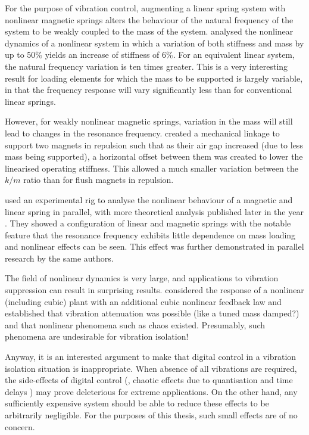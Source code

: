 For the purpose of vibration control, augmenting a linear spring system with
nonlinear magnetic springs alters the behaviour of the natural frequency of
the system to be weakly coupled to the mass of the system.
\textcite{dangola2006} analysed the nonlinear dynamics of a nonlinear system
in which a variation of both stiffness and mass by up to 50\% yields an
increase of stiffness of 6\%. For an equivalent linear system, the natural
frequency variation is ten times greater. This is a very interesting result
for loading elements for which the mass to be supported is largely variable,
in that the frequency response will vary significantly less than for
conventional linear springs.

However, for weakly nonlinear magnetic springs, variation in the mass will
still lead to changes in the resonance frequency. \textcite{todaka2001}
created a mechanical linkage to support two magnets in repulsion such that as
their air gap increased (due to less mass being supported), a horizontal
offset between them was created to lower the linearised operating stiffness.
This allowed a much smaller variation between the $k/m$ ratio than for flush
magnets in repulsion.

\textcite{bonisoli2007} used an experimental rig to analyse the nonlinear
behaviour of a magnetic and linear spring in parallel, with more theoretical
analysis published later in the year \cite{bonisoli2007b}. They showed a
configuration of linear and magnetic springs with the notable feature that the
resonance frequency exhibits little dependence on mass loading and nonlinear
effects can be seen. This effect was further demonstrated in parallel research
by the same authors.

The field of nonlinear dynamics is very large, and applications to vibration
suppression can result in surprising results. \textcite{oueini1999} considered
the response of a nonlinear (including cubic) plant with an additional cubic
nonlinear feedback law and established that vibration attenuation was possible
(like a tuned mass damped?) and that nonlinear phenomena such as chaos
existed. Presumably, such phenomena are undesirable for vibration isolation!


\cite{zuo2004}

Anyway, it is an interested argument to make that digital control in a
vibration isolation situation is inappropriate. When absence of all
vibrations are required, the side-effects of digital control (\ie,
chaotic effects due to quantisation and time delays
\cite{csernak2007}) may prove deleterious for extreme applications. On
the other hand, any sufficiently expensive system should be able to
reduce these effects to be arbitrarily negligible. For the purposes of
this thesis, such small effects are of no concern.


